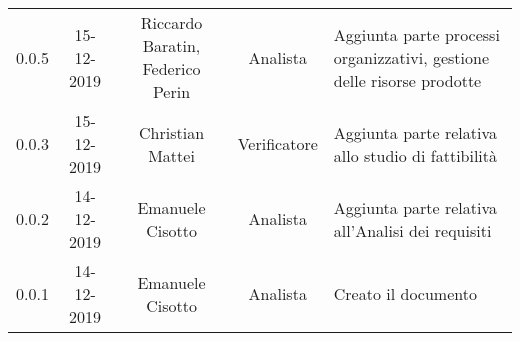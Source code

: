{\begin{longtable}{ c c  c  c C{4cm}}
0.0.5 & 15-12-2019 & Riccardo Baratin, Federico Perin & Analista & Aggiunta parte processi organizzativi, gestione delle risorse prodotte \\

0.0.3 & 15-12-2019 & Christian Mattei & Verificatore & Aggiunta parte relativa allo studio di fattibilità \\

0.0.2 & 14-12-2019 & Emanuele Cisotto & Analista & Aggiunta parte relativa all’Analisi dei requisiti \\

0.0.1 & 14-12-2019 & Emanuele Cisotto & Analista & Creato il documento \\
		
\end{longtable}
}